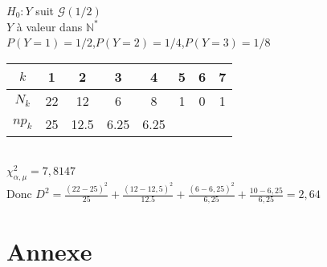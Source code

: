 \documentclass[12pt]{report}
\newcommand{\N}{\mathbb{N}}
\begin{document}
$H_0 : Y$ suit $\mathcal{G}(1/2)$\\
$Y$ à valeur dans $\N^*$\\
$P(Y=1) = 1/2$,$P(Y=2) = 1/4$,$P(Y=3)=1/8$\\
\begin{tabular}{|c|c|c|c|c|c|c|c|}
    \hline
    $k$&1&2&3&4&5&6&7\\
    \hline  
    $N_k$&22&12&6&8&1&0&1\\
    \hline
    $np_k$&25&12.5&6.25&6.25&&&\\
    \hline
\end{tabular}\\

$\chi_{\alpha,\mu}^2 = 7,8147$\\
Donc $D^2 = \frac{(22-25)^2}{25} + \frac{(12-12,5)^2}{12.5} + \frac{(6-6,25)^2}{6,25} + \frac{10-6,25}{6,25} = 2,64$

\chapter*{Annexe}
\end{document}

